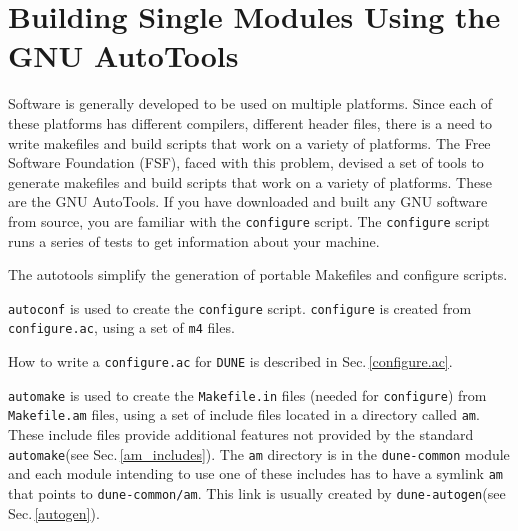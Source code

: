 \documentclass[11pt,a4paper,headinclude,footinclude,DIV16,normalheadings]{scrartcl}
\newcommand{\dune}{\texttt{DUNE}\xspace}
\newcommand{\autoconf}{\texttt{autoconf}\xspace}
\newcommand{\automake}{\texttt{automake}\xspace}
\newcommand{\autogen}{\texttt{dune-autogen}\xspace}
\newcommand{\configure}{\texttt{configure}\xspace}
\newcommand{\configureac}{\texttt{configure.ac}\xspace}
\newcommand{\makefilein}{\texttt{Makefile.in}\xspace}
\newcommand{\makefileam}{\texttt{Makefile.am}\xspace}
\newcommand{\dunecommon}{\texttt{dune-common}\xspace}
\begin{document}
\section{Building Single Modules Using the GNU AutoTools}

Software is generally developed to be used on multiple
platforms. Since each of these platforms has different compilers,
different header files, there is a need to write makefiles and build
scripts that work on a variety of platforms. The Free
Software Foundation (FSF), faced with this problem, devised a
set of tools to generate makefiles and build scripts that work on a
variety of platforms. These are the GNU AutoTools. 
If you have downloaded and built any GNU
software from source, you are familiar with the \configure script. The
\configure script runs a series of tests to get information about
your machine.

The autotools simplify the generation of portable Makefiles and
configure scripts.


\autoconf is used to create the \configure script. \configure is
created from \configureac, using a set of \texttt{m4} files.

\begin{center}
\end{center}

How to write a \configureac for \dune is described in Sec.\,\ref{configure.ac}.


\automake is used to create the \makefilein files (needed for
\configure) from \makefileam files, using a set of include files
located in a directory called \texttt{am}. These include files provide
additional features not provided by the standard \automake (see
Sec.\,\ref{am_includes}). The \texttt{am} directory is in the \dunecommon
module and each module intending to use one of these includes has to
have a symlink \texttt{am} that points to \texttt{dune-common/am}.
This link is usually created by \autogen (see Sec.\,\ref{autogen}).
\end{document}

